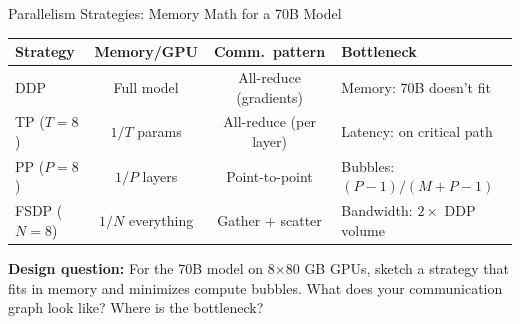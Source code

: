 \begin{thinkfirst}{Parallelism Strategies: Memory Math for a 70B Model}
\begin{center}
\small
\begin{tabular}{@{}lccl@{}}
\toprule
\textbf{Strategy} & \textbf{Memory/GPU} & \textbf{Comm.\ pattern} & \textbf{Bottleneck} \\
\midrule
DDP          & Full model      & All-reduce (gradients)   & Memory: 70B doesn't fit \\
TP ($T{=}8$) & $1/T$ params    & All-reduce (per layer)   & Latency: on critical path \\
PP ($P{=}8$) & $1/P$ layers    & Point-to-point           & Bubbles: $(P{-}1)/(M{+}P{-}1)$ \\
FSDP ($N{=}8$) & $1/N$ everything & Gather + scatter       & Bandwidth: $2\times$ DDP volume \\
\bottomrule
\end{tabular}
\end{center}

\medskip
\textbf{Design question:} For the 70B model on 8$\times$80 GB GPUs, sketch a strategy that fits in
memory and minimizes compute bubbles.
What does your communication graph look like?
Where is the bottleneck?
\end{thinkfirst}

